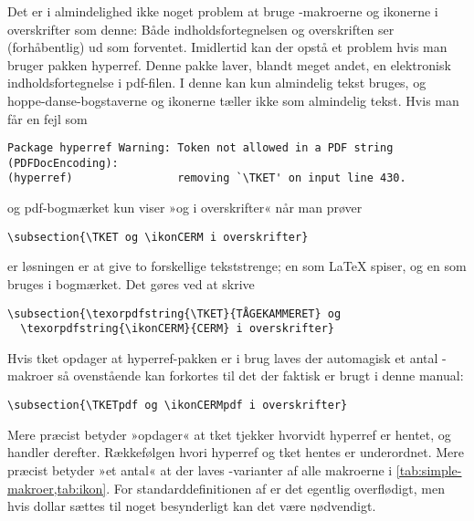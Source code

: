 \documentclass[a4paper,article,oneside,danish]{memoir}
\newcommand{\pakkenavn}[1]{\textsf{#1}}
\newcommand{\ptket}{\pakkenavn{tket}\xspace}
\newcommand*{\optionname}[1]{\textcolor{option}{#1}}
\begin{document}
Det er i almindelighed ikke noget problem at bruge -makroerne
og ikonerne i overskrifter som denne: Både indholdsfortegnelsen og
overskriften ser (forhåbentlig) ud som forventet. Imidlertid kan der
opstå et problem hvis man bruger pakken \pakkenavn{hyperref}. Denne
pakke laver, blandt meget andet, en elektronisk indholdsfortegnelse i
pdf-filen. I denne kan kun almindelig tekst bruges, og
hoppe-danse-bogstaverne og ikonerne tæller ikke som almindelig
tekst. Hvis man får en fejl som
\begin{lstlisting}
Package hyperref Warning: Token not allowed in a PDF string (PDFDocEncoding):
(hyperref)                removing `\TKET' on input line 430.
\end{lstlisting}
og pdf-bogmærket kun viser »og i overskrifter« når man prøver
\begin{lstlisting}
\subsection{\TKET og \ikonCERM i overskrifter}
\end{lstlisting}
er løsningen er at give to
forskellige tekststrenge; en som \LaTeX{} spiser, og en som bruges i
bogmærket. Det gøres ved at skrive
\begin{lstlisting}
\subsection{\texorpdfstring{\TKET}{TÅGEKAMMERET} og
  \texorpdfstring{\ikonCERM}{CERM} i overskrifter}
\end{lstlisting}

Hvis \ptket opdager at \pakkenavn{hyperref}-pakken er i brug laves der
automagisk et antal -makroer så ovenstående kan forkortes
til det der faktisk er brugt i denne manual:
\begin{lstlisting}
\subsection{\TKETpdf og \ikonCERMpdf i overskrifter}
\end{lstlisting}
Mere præcist betyder »opdager« at \ptket tjekker 
hvorvidt \pakkenavn{hyperref} er hentet, og handler
derefter. Rækkefølgen hvori \pakkenavn{hyperref} og \ptket hentes er
underordnet. Mere præcist betyder »et antal« at der laves
-varianter af alle makroerne i \vref{tab:simple-makroer,tab:ikon}.
For standarddefinitionen af  er det
egentlig overflødigt, men hvis \optionname{dollar} sættes til noget
besynderligt kan det være nødvendigt.
\end{document}
